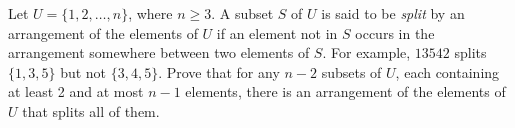 Let $U = \{1, 2, \ldots, n\}$, where $n \geq 3$. A subset $S$ of $U$ is said to be \emph{split} by an arrangement of the elements of $U$ if an element not in $S$ occurs in the arrangement somewhere between two elements of $S$. For example, $13542$ splits $\{1, 3, 5\}$ but not $\{3, 4, 5\}$. Prove that for any $n - 2$ subsets of $U$, each containing at least 2 and at most $n - 1$ elements, there is an arrangement of the elements of $U$ that splits all of them.
